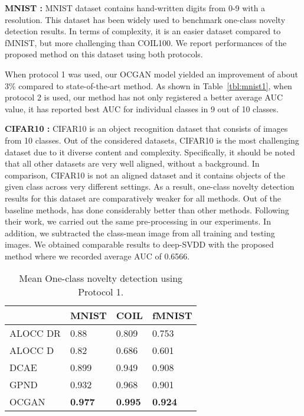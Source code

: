 \documentclass[10pt,twocolumn,letterpaper]{article}
\begin{document}
\noindent  \textbf{MNIST :} MNIST dataset contains hand-written digits from 0-9 with a  resolution. This dataset has been widely used to benchmark one-class novelty detection results. In terms of complexity, it is an easier dataset compared to fMNIST, but more challenging than COIL100. We report performances of the proposed method on this dataset using both protocols.

When protocol 1 was used, our OCGAN model yielded an improvement of about 3\% compared to state-of-the-art \cite{GPND} method. As shown in Table~\ref{tbl:mnist1}, when protocol 2 is used, our method has not only registered a better average AUC value, it has reported best AUC for individual classes in 9 out of 10 classes. 

\noindent  \textbf{CIFAR10 :} CIFAR10 is an object recognition dataset that consists of images from 10 classes. Out of the considered datasets, CIFAR10 is the most challenging dataset due to it diverse content and complexity. Specifically, it should be noted that all other datasets are very well aligned, without a background. In comparison, CIFAR10 is not an aligned dataset and it contains objects of the given class across very different settings. As a result, one-class novelty detection results for this dataset are comparatively weaker for all methods. Out of the baseline methods, \cite{dsvdd} has done considerably better than other methods. Following their work, we carried out the same pre-processing in our experiments. In addition, we subtracted the class-mean image from all training and testing images. We obtained comparable results to deep-SVDD with the proposed method where we recorded average AUC of 0.6566.

\begin{table}[]
	\centering
	\caption{Mean One-class novelty detection using Protocol 1.}
	\label{tbl:proto2}


\begin{tabular}{|l|l|l|l|}
\hline
 &MNIST            & COIL  & fMNIST       \\ \hline
ALOCC DR \cite{cvpr2018} & 0.88  & 0.809  & 0.753 \\ \hline
ALOCC D \cite{cvpr2018}  & 0.82  & 0.686  & 0.601 \\ \hline
DCAE    \cite{AE}         & 0.899 & 0.949  & 0.908 \\ \hline
GPND \cite{GPND}     & 0.932 & 0.968  & 0.901 \\ \hline
OCGAN             & \textbf{0.977} & \textbf{0.995}  & \textbf{0.924} \\ \hline
\end{tabular}
\end{table}
\end{document}
